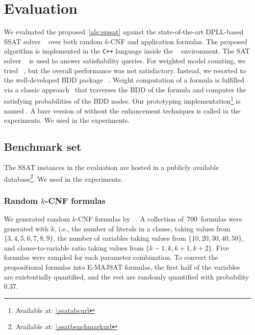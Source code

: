 \renewcommand{\nrandom}{\num{700}}
\renewcommand{\napplication}{\num{160}}
\newcommand{\ntoilet}{\num{77}}
\newcommand{\nmaxcount}{\num{26}}
\newcommand{\nsandcastle}{\num{25}}
\newcommand{\nconformant}{\num{24}}
\newcommand{\nmpec}{\num{8}}

\section{Evaluation}
\label{sect:erssat-evaluation}

We evaluated the proposed~\cref{alg:erssat} against
the state-of-the-art DPLL-based SSAT solver \dcssat~\cite{Majercik2005}
over both random $k$-CNF and application formulas.
The proposed algorithm is implemented in the \texttt{C++} language inside the \abc~\cite{ABC} environment.
The SAT solver ~\cite{Een2003Solver} is used to answer satisfiability queries.
For weighted model counting,
we tried \cachet~\cite{Sang2004,Sang2005ModelCounting},
but the overall performance was not satisfactory.
Instead, we resorted to the well-developed BDD package \cudd~\cite{CUDD}.
Weight computation of a formula is fulfilled via a classic approach~\cite{Darwiche2002KnowledgeCompilation} that traverses the BDD of the formula and computes the satisfying probabilities of the BDD nodes.
Our prototyping implementation\footnote{Available at: \url{\ssatabcurl}} is named \erssat.
A bare version of \erssat without the enhancement techniques is called \erssatb in the experiments.
We used \ssatABCRevision in the experiments.

\subsection{Benchmark set}
The SSAT instances in the evaluation are hosted
in a publicly available database\footnote{Available at: \url{\ssatbenchmarkurl}}.
We used \ssatBenchRevision in the experiments.

\subsubsection{Random $k$-CNF formulas}
We generated random $k$-CNF formulas by \cnfgen~\cite{Lauria2017CNFgen}.
A collection of~\nrandom~formulas were generated with $k$,
i.e., the number of literals in a clause,
taking values from $\{3,4,5,6,7,8,9\}$,
the number of variables taking values from $\{10,20,30,40,50\}$,
and clause-to-variable ratio taking values from $\{k-1,k,k+1,k+2\}$.
Five formulas were sampled for each parameter combination.
To convert the propositional formulas into E-MAJSAT formulas,
the first half of the variables are existentially quantified,
and the rest are randomly quantified with probability $0.37$.


